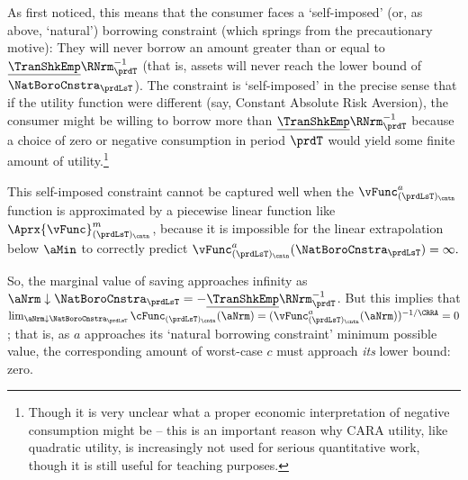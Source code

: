 \documentclass[\econtexRoot/SolvingMicroDSOPs]{subfiles}
\begin{document}
As \cite{zeldesStochastic} first noticed, this means that the consumer faces a `self-imposed' (or, as above, `natural') borrowing constraint (which springs from the precautionary motive): They will never borrow an amount greater than or equal to $\underline{\TranShkEmp}\RNrm_{\prdT}^{-1}$ (that is, assets will never reach the lower bound of $\NatBoroCnstra_{\prdLsT}$).  The constraint is `self-imposed' in the precise sense that if the utility function were different (say, Constant Absolute Risk Aversion), the consumer might be willing to borrow more than $\underline{\TranShkEmp}\RNrm_{\prdT}^{-1}$ because a choice of zero or negative consumption in period $\prdT$ would yield some finite amount of utility.\footnote{Though it is very unclear what a proper economic interpretation of negative consumption might be -- this is an important reason why CARA utility, like quadratic utility, is increasingly not used for serious quantitative work, though it is still useful for teaching purposes.}

This self-imposed constraint cannot be captured well when the $\vFunc^{{a}}_{({\prdLsT})_\cntn}$ function is approximated by a piecewise linear function like $\Aprx{\vFunc}^{{m}}_{({\prdLsT})_\cntn}$, because it is impossible for the linear extrapolation below $\aMin$ to correctly predict $\vFunc^{{a}}_{({\prdLsT})_\cntn}(\NatBoroCnstra_{\prdLsT})=\infty.$ %


So, the marginal value of saving approaches infinity as $\aNrm \downarrow \NatBoroCnstra_{\prdLsT}=-\underline{\TranShkEmp}\RNrm_{\prdT}^{-1}$.  But this implies that $\lim_{\aNrm \downarrow \NatBoroCnstra_{\prdLsT}} \cFunc_{({\prdLsT})_\cntn}(\aNrm) = (\vFunc^{{a}}_{({\prdLsT})_\cntn}(\aNrm))^{-1/\CRRA} = 0$; that is, as ${a}$ approaches its `natural borrowing constraint' minimum possible value, the corresponding amount of worst-case ${c}$ must approach \textit{its} lower bound: zero.
\end{document}
